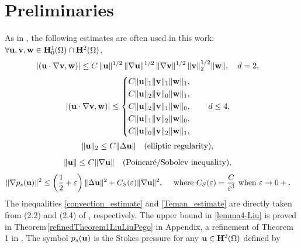 \documentclass{article}
\theoremstyle{definition}                   %
\begin{document}
\section{Preliminaries}
\label{sec_preliminaries}
As in \cite{HuangShen2023},  the following estimates are often used in this work:
$\forall {\bf u}, {\bf v}, {\bf w}\in {\bf H}^1_0(\Omega)\cap {\bf H}^2(\Omega)$, 
\begin{align}
|({\bf u}\cdot\nabla {\bf v}, {\bf w})|
& \le C\,
\|{\bf u}\|^{1/2}\,\|\nabla {\bf u}\|^{1/2} \,
\|\nabla {\bf v}\|^{1/2}\,\| {\bf v}\|_2^{1/2} \|{\bf w}\|,
\quad d=2, 
\label{convection_estimate}
\end{align}
\begin{align}
|({\bf u}\cdot\nabla {\bf v}, {\bf w})|
&\le
\left\{
\begin{aligned}
&C \|\mathbf u\|_{1}\|\mathbf v\|_{1}\|\mathbf w\|_{1},\\
&C \|\mathbf u\|_{2}\|\mathbf v\|_{0}\|\mathbf w\|_{1},\\
&C \|\mathbf u\|_{2}\|\mathbf v\|_{1}\|\mathbf w\|_{0},\\
&C \|\mathbf u\|_{1}\|\mathbf v\|_{2}\|\mathbf w\|_{0},\\
&C \|\mathbf u\|_{0}\|\mathbf v\|_{2}\|\mathbf w\|_{1},
\end{aligned}
\right.
\qquad d\le 4,
\label{Teman_estimate}
\end{align}
\begin{align}
\|{\bf u}\|_2
&\le C \|\Delta {\bf u} \|
\quad \text{(elliptic regularity)},
\label{elliptic_regularity}
\end{align}
\begin{align}
\|{\bf u} \|
&\le C \| \nabla {\bf u} \|
\quad \text{(Poincar\'{e}/Sobolev inequality)},
\label{Sobole-inequality}
\end{align}
\begin{align}
\|\nabla p_s({\bf u})\|^2 
&\le \left(\frac{1}{2}+\varepsilon\right) \|\Delta {\bf u}\|^2
+ C_S(\varepsilon) \| \nabla {\bf u} \|^2,
\quad \text{ where } C_S(\varepsilon)=\frac{C}{\varepsilon^3} \text{ when } \varepsilon\to 0+.
\label{lemma4-Liu}
\end{align}
The inequalities \eqref{convection_estimate} and  \eqref{Teman_estimate} are 
directly taken from (2.2) and (2.4) of \cite{HuangShen2023}, respectively.
The upper bound in  \eqref{lemma4-Liu} is proved in Theorem\,\ref{refinedTheorem1LiuLiuPego} in Appendix, a refinement of Theorem 1 in \cite{LiuLiuPego2007}. The symbol    
$p_s({\bf u})$ is the  Stokes pressure for any ${\bf u} \in {\bf H}^{2}(\Omega)$ defined by
\end{document}
